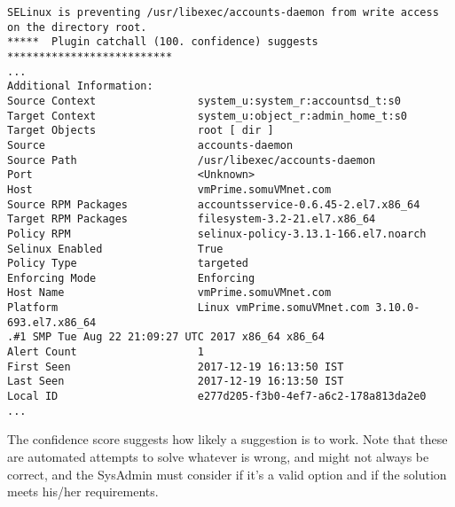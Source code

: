 \vspace{-15pt}
\begin{verbatim}
SELinux is preventing /usr/libexec/accounts-daemon from write access on the directory root.
*****  Plugin catchall (100. confidence) suggests   **************************
...
Additional Information:
Source Context                system_u:system_r:accountsd_t:s0
Target Context                system_u:object_r:admin_home_t:s0
Target Objects                root [ dir ]
Source                        accounts-daemon
Source Path                   /usr/libexec/accounts-daemon
Port                          <Unknown>
Host                          vmPrime.somuVMnet.com
Source RPM Packages           accountsservice-0.6.45-2.el7.x86_64
Target RPM Packages           filesystem-3.2-21.el7.x86_64
Policy RPM                    selinux-policy-3.13.1-166.el7.noarch
Selinux Enabled               True
Policy Type                   targeted
Enforcing Mode                Enforcing
Host Name                     vmPrime.somuVMnet.com
Platform                      Linux vmPrime.somuVMnet.com 3.10.0-693.el7.x86_64
.#1 SMP Tue Aug 22 21:09:27 UTC 2017 x86_64 x86_64
Alert Count                   1
First Seen                    2017-12-19 16:13:50 IST
Last Seen                     2017-12-19 16:13:50 IST
Local ID                      e277d205-f3b0-4ef7-a6c2-178a813da2e0
...
\end{verbatim}
\vspace{-10pt}

\noindent
The confidence score suggests how likely a suggestion is to work. Note that these are automated attempts to solve whatever is wrong, and might not always be correct, and the SysAdmin must consider if it's a valid option and if the solution meets his/her requirements. 

